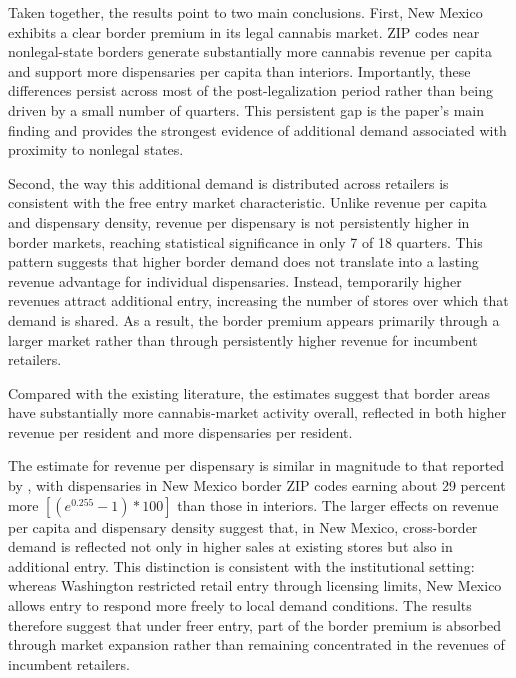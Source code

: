 \documentclass[english,12pt]{article}
\begin{document}
Taken together, the results point to two main conclusions. First, New Mexico exhibits a clear border premium in its legal cannabis market. ZIP codes near nonlegal-state borders generate substantially more cannabis revenue per capita and support more dispensaries per capita than interiors. Importantly, these differences persist across most of the post-legalization period rather than being driven by a small number of quarters. This persistent gap is the paper’s main finding and provides the strongest evidence of additional demand associated with proximity to nonlegal states.

Second, the way this additional demand is distributed across retailers is consistent with the free entry market characteristic. Unlike revenue per capita and dispensary density, revenue per dispensary is not persistently higher in border markets, reaching statistical significance in only 7 of 18 quarters. This pattern suggests that higher border demand does not translate into a lasting revenue advantage for individual dispensaries. Instead, temporarily higher revenues attract additional entry, increasing the number of stores over which that demand is shared. As a result, the border premium appears primarily through a larger market rather than through persistently higher revenue for incumbent retailers. 

Compared with the existing literature, the estimates suggest that border areas have substantially more cannabis-market activity overall, reflected in both higher revenue per resident and more dispensaries per resident.

The estimate for revenue per dispensary is similar in magnitude to that reported by \cite{HansenMillerWeber2020}, with dispensaries in New Mexico border ZIP codes earning about 29 percent more $\left[(e^{0.255}-1)*100\right]$ than those in interiors.
The larger effects on revenue per capita and dispensary density suggest that, in New Mexico, cross-border demand is reflected not only in higher sales at existing stores but also in additional entry. This distinction is consistent with the institutional setting: whereas Washington restricted retail entry through licensing limits, New Mexico allows entry to respond more freely to local demand conditions. The results therefore suggest that under freer entry, part of the border premium is absorbed through market expansion rather than remaining concentrated in the revenues of incumbent retailers.


\end{document}
